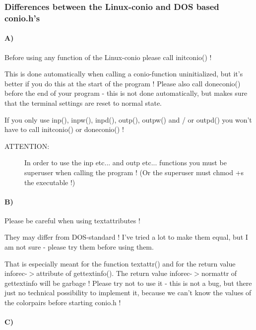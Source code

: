 \documentclass[10pt,a4paper,oneside,onecolumn]{article}
\begin{document}
\subsubsection{Differences between the Linux-conio and DOS based conio.h's}


\paragraph{A) }

Before using any function of the Linux-conio please call initconio()
!

This is done automatically when calling a conio-function uninitialized,
but it's better if you do this at the start of the program ! Please
also call doneconio() before the end of your program - this is not
done automatically, but makes sure that the terminal settings are
reset to normal state.

If you only use inp(), inpw(), inpd(), outp(), outpw() and / or outpd()
you won't have to call initconio() or doneconio() !

\begin{description}

\item [ATTENTION:]In order to use the inp etc... and outp etc... functions
you must be superuser when calling the program ! (Or the superuser
must \lyxquote{}chmod +s\lyxquote{} the executable !)

\end{description}


\paragraph{B)}

Please be careful when using textattributes !

They may differ from DOS-standard ! I've tried a lot to make them
equal, but I am not sure - please try them before using them. 

That is especially meant for the function textattr() and for the return
value inforec-\(>\)attribute of gettextinfo(). The return value
inforec-\(>\)normattr of gettextinfo will be garbage ! Please try
not to use it - this is not a bug, but there just no technical possibility
to implement it, because we can't know the values of the colorpairs
before starting conio.h !


\paragraph{C)}
\end{document}
